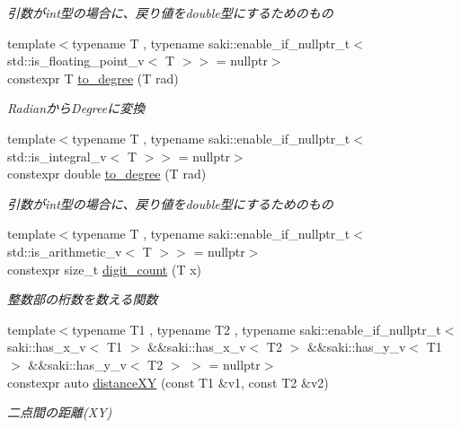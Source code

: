 \begin{DoxyCompactItemize}
\begin{DoxyCompactList}\small\item\em 引数がint型の場合に、戻り値をdouble型にするためのもの \end{DoxyCompactList}\item 
{\footnotesize template$<$typename T , typename saki\+::enable\+\_\+if\+\_\+nullptr\+\_\+t$<$ std\+::is\+\_\+floating\+\_\+point\+\_\+v$<$ T $>$$>$  = nullptr$>$ }\\constexpr T \mbox{\hyperlink{namespacesaki_af9f6d8f2c0663a0452c7edd17bf5daf0}{to\+\_\+degree}} (T rad)
\begin{DoxyCompactList}\small\item\em Radianから\+Degreeに変換 \end{DoxyCompactList}\item 
{\footnotesize template$<$typename T , typename saki\+::enable\+\_\+if\+\_\+nullptr\+\_\+t$<$ std\+::is\+\_\+integral\+\_\+v$<$ T $>$$>$  = nullptr$>$ }\\constexpr double \mbox{\hyperlink{namespacesaki_aa7cb33956f8d7354b485aee878d7805d}{to\+\_\+degree}} (T rad)
\begin{DoxyCompactList}\small\item\em 引数がint型の場合に、戻り値をdouble型にするためのもの \end{DoxyCompactList}\item 
{\footnotesize template$<$typename T , typename saki\+::enable\+\_\+if\+\_\+nullptr\+\_\+t$<$ std\+::is\+\_\+arithmetic\+\_\+v$<$ T $>$$>$  = nullptr$>$ }\\constexpr size\+\_\+t \mbox{\hyperlink{namespacesaki_a467dee57b7bbe101146713a82acfe95e}{digit\+\_\+count}} (T x)
\begin{DoxyCompactList}\small\item\em 整数部の桁数を数える関数 \end{DoxyCompactList}\item 
{\footnotesize template$<$typename T1 , typename T2 , typename saki\+::enable\+\_\+if\+\_\+nullptr\+\_\+t$<$ saki\+::has\+\_\+x\+\_\+v$<$ T1 $>$ \&\&saki\+::has\+\_\+x\+\_\+v$<$ T2 $>$ \&\&saki\+::has\+\_\+y\+\_\+v$<$ T1 $>$ \&\&saki\+::has\+\_\+y\+\_\+v$<$ T2 $>$ $>$  = nullptr$>$ }\\constexpr auto \mbox{\hyperlink{namespacesaki_ae6eddecfb6a747238185b21c8ee1cd60}{distance\+XY}} (const T1 \&v1, const T2 \&v2)
\begin{DoxyCompactList}\small\item\em 二点間の距離(\+X\+Y) \end{DoxyCompactList}\item 

\end{DoxyCompactItemize}
